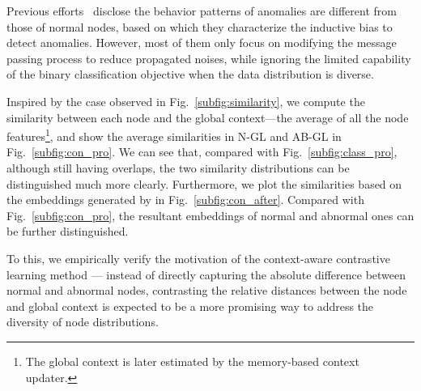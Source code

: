 Previous efforts~\cite{liu2020alleviating, kumar2018rev2} disclose the behavior patterns of anomalies are different from those of normal nodes, based on which they characterize the inductive bias to detect anomalies. 
However, most of them only focus on modifying the message passing process to reduce propagated noises, while ignoring the limited capability of the binary classification objective 
when the data distribution is diverse. 

Inspired by the case observed in Fig.~\ref{subfig:similarity}, we compute the similarity between each node and the global context---the average of all the node features\footnote{The global context is later estimated by the memory-based context updater.}, and show the average similarities in N-GL and AB-GL in Fig.~\ref{subfig:con_pro}. 
We can see that, compared with Fig.~\ref{subfig:class_pro}, although still having overlaps, the two similarity distributions can be distinguished much more clearly. 
Furthermore, we plot the similarities based on the embeddings generated by \smodel in Fig.~\ref{subfig:con_after}. Compared with Fig.~\ref{subfig:con_pro}, the resultant embeddings of normal and abnormal ones can be further distinguished.  

To this, we empirically verify the motivation of the context-aware contrastive learning method --- instead of directly capturing the absolute difference between normal and abnormal nodes, contrasting the relative distances between the node and global context is expected to be a more promising way to address the diversity of node distributions. 



